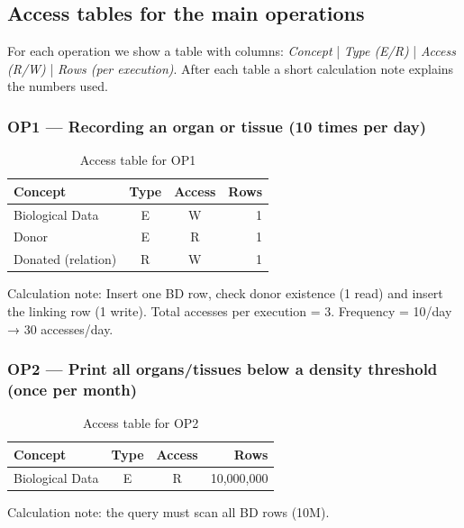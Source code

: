\documentclass[11pt,a4paper]{article}
\begin{document}
\subsection{Access tables for the main operations}

For each operation we show a table with columns: \emph{Concept} | \emph{Type (E/R)} | \emph{Access (R/W)} | \emph{Rows (per execution)}.  After each table a short calculation note explains the numbers used.

\subsubsection*{OP1 — Recording an organ or tissue (10 times per day)}
\begin{table}[H]
\centering
\begin{tabular}{|l|c|c|r|}
\hline
\textbf{Concept} & \textbf{Type} & \textbf{Access} & \textbf{Rows} \\
\hline
Biological Data & E & W & 1 \\
Donor & E & R & 1 \\
Donated (relation) & R & W & 1 \\
\hline
\end{tabular}
\caption{Access table for OP1}
\end{table}

Calculation note: Insert one BD row, check donor existence (1 read) and insert the linking row (1 write). Total accesses per execution = 3. Frequency = 10/day → 30 accesses/day.

\subsubsection*{OP2 — Print all organs/tissues below a density threshold (once per month)}
\begin{table}[H]
\centering
\begin{tabular}{|l|c|c|r|}
\hline
\textbf{Concept} & \textbf{Type} & \textbf{Access} & \textbf{Rows} \\
\hline
Biological Data & E & R & 10,000,000 \\
\hline
\end{tabular}
\caption{Access table for OP2}
\end{table}

Calculation note: the query must scan all BD rows (10M).
\end{document}
